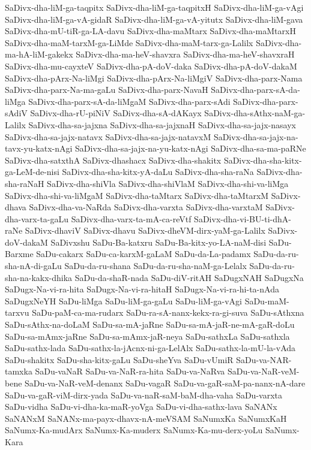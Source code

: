 {SaDivx-dha-liM-ga-taqpitx
SaDivx-dha-liM-ga-taqpitxH
SaDivx-dha-liM-ga-vAgi
SaDivx-dha-liM-ga-vA-gidaR
SaDivx-dha-liM-ga-vA-yitutx
SaDivx-dha-liM-gava
SaDivx-dha-mU-tiR-ga-LA-davu
SaDivx-dha-maMtarx
SaDivx-dha-maMtarxH
SaDivx-dha-maM-tarxM-ga-LiMde
SaDivx-dha-maM-tarx-ga-Lalilx
SaDivx-dha-ma-hA-liM-gakekx
SaDivx-dha-ma-heV-shavxra
SaDivx-dha-ma-heV-shavxraH
SaDivx-dha-mu-cayxteV
SaDivx-dha-pA-doV-daka
SaDivx-dha-pA-doV-dakaM
SaDivx-dha-pArx-Na-liMgi
SaDivx-dha-pArx-Na-liMgiV
SaDivx-dha-parx-Nama
SaDivx-dha-parx-Na-ma-gaLu
SaDivx-dha-parx-NavaH
SaDivx-dha-parx-sA-da-liMga
SaDivx-dha-parx-sA-da-liMgaM
SaDivx-dha-parx-sAdi
SaDivx-dha-parx-sAdiV
SaDivx-dha-rU-piNiV
SaDivx-dha-sA-dAKayx
SaDivx-dha-sAthx-naM-ga-Lalilx
SaDivx-dha-sa-jajxna
SaDivx-dha-sa-jajxnaH
SaDivx-dha-sa-jajx-nasayx
SaDivx-dha-sa-jajx-natavx
SaDivx-dha-sa-jajx-natavxM
SaDivx-dha-sa-jajx-na-tavx-yu-katx-nAgi
SaDivx-dha-sa-jajx-na-yu-katx-nAgi
SaDivx-dha-sa-ma-paRNe
SaDivx-dha-satxthA
SaDivx-dhashacx
SaDivx-dha-shakitx
SaDivx-dha-sha-kitx-ga-LeM-de-nisi
SaDivx-dha-sha-kitx-yA-daLu
SaDivx-dha-sha-raNa
SaDivx-dha-sha-raNaH
SaDivx-dha-shiVla
SaDivx-dha-shiVlaM
SaDivx-dha-shi-va-liMga
SaDivx-dha-shi-va-liMgaM
SaDivx-dha-taMtarx
SaDivx-dha-taMtarxM
SaDivx-dhava
SaDivx-dha-va-NaRda
SaDivx-dha-varxta
SaDivx-dha-varxtaM
SaDivx-dha-varx-ta-gaLu
SaDivx-dha-varx-ta-mA-ca-reVtf
SaDivx-dha-vi-BU-ti-dhA-raNe
SaDivx-dhaviV
SaDivx-dhavu
SaDivx-dheVM-dirx-yaM-ga-Lalilx
SaDivx-doV-dakaM
SaDivxshu
SaDu-Ba-katxru
SaDu-Ba-kitx-yo-LA-naM-disi
SaDu-Barxme
SaDu-cakarx
SaDu-ca-karxM-gaLaM
SaDu-da-La-padamx
SaDu-da-ru-sha-nA-di-gaLu
SaDu-da-ru-shana
SaDu-da-ru-sha-naM-ga-Lelalx
SaDu-da-ru-sha-na-kakx-dhika
SaDu-da-shaR-nada
SaDu-diV-ritAH
SaDugxNAH
SaDugxNa
SaDugx-Na-vi-ra-hita
SaDugx-Na-vi-ra-hitaH
SaDugx-Na-vi-ra-hi-ta-nAda
SaDugxNeYH
SaDu-liMga
SaDu-liM-ga-gaLu
SaDu-liM-ga-vAgi
SaDu-maM-tarxvu
SaDu-paM-ca-ma-rudarx
SaDu-ra-sA-nanx-kekx-ra-gi-suva
SaDu-sAthxna
SaDu-sAthx-na-doLaM
SaDu-sa-mA-jaRne
SaDu-sa-mA-jaR-ne-mA-gaR-doLu
SaDu-sa-mAmx-jaRne
SaDu-sa-mAmx-jaR-neya
SaDu-sathxLa
SaDu-sathxla
SaDu-sathx-lada
SaDu-sathx-la-jAcnx-ni-ga-LelAlx
SaDu-sathx-la-mU-la-vAda
SaDu-shakitx
SaDu-sha-kitx-gaLu
SaDu-sheYva
SaDu-vUmiR
SaDu-va-NAR-tamxka
SaDu-vaNaR
SaDu-va-NaR-ra-hita
SaDu-va-NaRva
SaDu-va-NaR-veM-bene
SaDu-va-NaR-veM-denanx
SaDu-vagaR
SaDu-va-gaR-saM-pa-nanx-nA-dare
SaDu-va-gaR-viM-dirx-yada
SaDu-va-naR-saM-baM-dha-vaha
SaDu-varxta
SaDu-vidha
SaDu-vi-dha-ka-maR-yoVga
SaDu-vi-dha-sathx-lava
SaNANx
SaNANxM
SaNANx-ma-payx-dhavx-nA-meVSAM
SaNumxKa
SaNumxKaH
SaNumx-Ka-mudArx
SaNumx-Ka-muderx
SaNumx-Ka-mu-derx-yoLu
SaNumx-Kara
}
